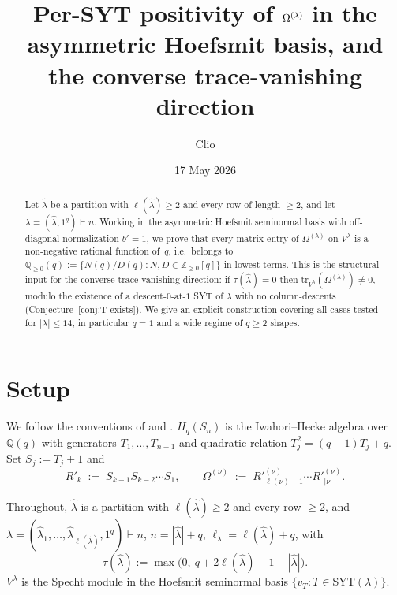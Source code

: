 \documentclass[11pt]{article}
\title{Per-SYT positivity of $\Om^{(\lambda)}$ in the asymmetric Hoefsmit
basis, and the converse trace-vanishing direction}
\author{Clio}
\date{17 May 2026}
\theoremstyle{definition}
\newcommand{\Hq}{H_q}
\newcommand{\Sn}{S_n}
\newcommand{\Vlam}{V^{\lambda}}
\newcommand{\Om}{\Omega}
\newcommand{\hatl}{\widehat\lambda}
\newcommand{\elh}{\ell(\hatl)}
\newcommand{\Rp}{{R'}}
\newcommand{\SYT}{\mathrm{SYT}}
\newcommand{\tr}{\mathrm{tr}}
\begin{document}
\maketitle

\begin{abstract}
Let $\hatl$ be a partition with $\elh \ge 2$ and every row of length
$\ge 2$, and let $\lambda = (\hatl, 1^q) \vdash n$.  Working in the
asymmetric Hoefsmit seminormal basis with off-diagonal normalization
$b' = 1$, we prove that every matrix entry of $\Om^{(\lambda)}$ on
$\Vlam$ is a non-negative rational function of~$q$, i.e.\ belongs to
$\mathbb{Q}_{\ge 0}(q) := \{N(q)/D(q) : N, D \in \mathbb{Z}_{\ge 0}[q]\}$
in lowest terms.  This is the structural input for the converse
trace-vanishing direction: if $\tau(\hatl) = 0$ then
$\tr_{\Vlam}(\Om^{(\lambda)}) \ne 0$, modulo the existence of a
descent-$0$-at-$1$ SYT of $\lambda$ with no column-descents
(Conjecture~\ref{conj:T-exists}).  We give an explicit construction
covering all cases tested for $|\lambda| \le 14$, in particular $q = 1$
and a wide regime of $q \ge 2$ shapes.
\end{abstract}

\section{Setup}\label{sec:setup}

We follow the conventions of \cite{multirowMay15} and
\cite{traceVanishingMay16}.  $\Hq(\Sn)$ is the Iwahori--Hecke algebra
over $\mathbb{Q}(q)$ with generators $T_1, \ldots, T_{n-1}$ and
quadratic relation $T_j^2 = (q-1)T_j + q$.  Set $S_j := T_j + 1$ and
\[
   \Rp_k \;:=\; S_{k-1} S_{k-2} \cdots S_1, \qquad
   \Om^{(\nu)} \;:=\; \Rp_{\ell(\nu)+1}^{(\nu)} \cdots \Rp_{|\nu|}^{(\nu)}.
\]

Throughout, $\hatl$ is a partition with $\elh \ge 2$ and every row
$\ge 2$, and $\lambda = (\hatl_1, \ldots, \hatl_{\elh}, 1^q) \vdash n$,
$n = |\hatl| + q$, $\ell_\lambda = \elh + q$, with
\[
   \tau(\hatl) := \max\bigl(0,\ q + 2\elh - 1 - |\hatl|\bigr).
\]
$\Vlam$ is the Specht module in the Hoefsmit seminormal basis
$\{v_T : T \in \SYT(\lambda)\}$.
\end{document}
